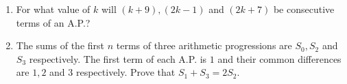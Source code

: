 \documentclass{article}                                         %
\begin{document}
                                                                                                                \begin{enumerate}
								\item For what value of $k$ will $(k+9), (2k-1)$ and $( 2k+7)$ be consecutive terms of an A.P.?

\item The sums of the first $n$ terms of three arithmetic progressions are $S_0, S_2$ and $S_3$ respectively. The first term of each A.P. is $1$ and their common differences are $1, 2$ and $3$ respectively. Prove that $S_1 + S_3 = 2S_2$.
								\end{enumerate}
								
\end{document}
